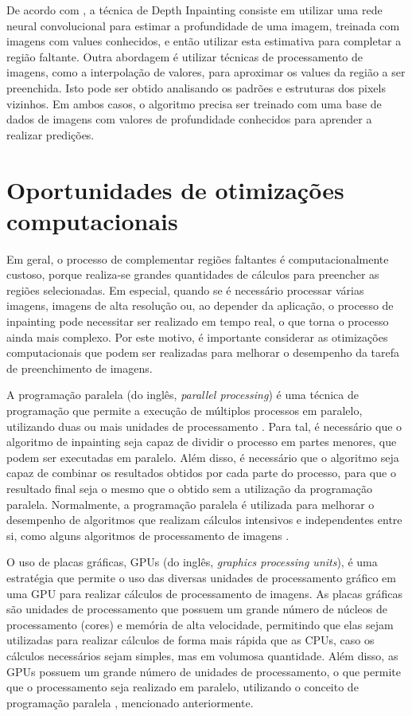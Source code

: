 De acordo com \cite{shish20203dphoto}, a técnica de Depth Inpainting consiste em utilizar uma rede neural convolucional para estimar a profundidade de uma imagem, treinada com imagens com values conhecidos, e então utilizar esta estimativa para completar a região faltante.
Outra abordagem é utilizar técnicas de processamento de imagens, como a interpolação de valores, para aproximar os values da região a ser preenchida. Isto pode ser obtido analisando os padrões e estruturas dos pixels vizinhos. Em ambos casos, o algoritmo precisa ser treinado com uma base de dados de imagens com valores de profundidade conhecidos para aprender a realizar predições.




\section{Oportunidades de otimizações computacionais}

Em geral, o processo de complementar regiões faltantes é computacionalmente custoso, porque realiza-se grandes quantidades de cálculos para preencher as regiões selecionadas. Em especial, quando se é necessário processar várias imagens, imagens de alta resolução ou, ao depender da aplicação, o processo de inpainting pode necessitar ser realizado em tempo real, o que torna o processo ainda mais complexo. Por este motivo, é importante considerar as otimizações computacionais que podem ser realizadas para melhorar o desempenho da tarefa de preenchimento de imagens.

A programação paralela (do inglês, \emph{parallel processing}) é uma técnica de programação que permite a execução de múltiplos processos em paralelo, utilizando duas ou mais unidades de processamento \cite{tanenbaum2014os}. Para tal, é necessário que o algoritmo de inpainting seja capaz de dividir o processo em partes menores, que podem ser executadas em paralelo. Além disso, é necessário que o algoritmo seja capaz de combinar os resultados obtidos por cada parte do processo, para que o resultado final seja o mesmo que o obtido sem a utilização da programação paralela.
Normalmente, a programação paralela é utilizada para melhorar o desempenho de algoritmos que realizam cálculos intensivos e independentes entre si, como alguns algoritmos de processamento de imagens \cite{gonzalez2006image}.

O uso de placas gráficas, GPUs (do inglês, \emph{graphics processing units}), é uma estratégia que permite o uso das diversas unidades de processamento gráfico em uma GPU para realizar cálculos de processamento de imagens. As placas gráficas são unidades de processamento que possuem um grande número de núcleos de processamento (cores) e memória de alta velocidade, permitindo que elas sejam utilizadas para realizar cálculos de forma mais rápida que as CPUs, caso os cálculos necessários sejam simples, mas em volumosa quantidade. Além disso, as GPUs possuem um grande número de unidades de processamento, o que permite que o processamento seja realizado em paralelo, utilizando o conceito de programação paralela \cite{tanenbaum2014os}, mencionado anteriormente.

